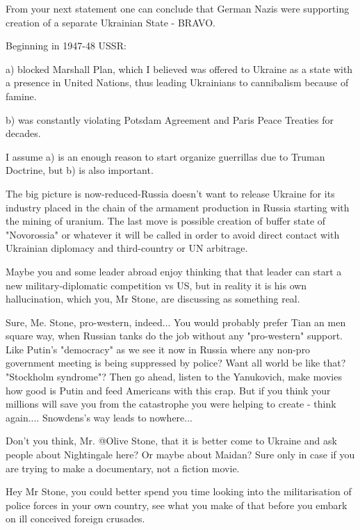 \begin{itemize}
From your next statement one can conclude that German Nazis were supporting
creation of a separate Ukrainian State - BRAVO.

Beginning in 1947-48 USSR:

a) blocked Marshall Plan, which I believed was offered to Ukraine as a state
with a presence in United Nations, thus leading Ukrainians to cannibalism
because of famine.

b) was constantly violating Potsdam Agreement and Paris Peace Treaties for decades.

I assume a) is an enough reason to start organize guerrillas due to Truman
Doctrine, but b) is also important.

The big picture is now-reduced-Russia doesn't want to release Ukraine for its
industry placed in the chain of the armament production in Russia starting with
the mining of uranium. The last move is possible creation of buffer state of
"Novorossia" or whatever it will be called in order to avoid direct contact
with Ukrainian diplomacy and third-country or UN arbitrage.

Maybe you and some leader abroad enjoy thinking that that leader can start a
new military-diplomatic competition vs US, but in reality it is his own
hallucination, which you, Mr Stone, are discussing as something real.


Sure, Me. Stone, pro-western, indeed... You would probably prefer Tian an men
square way, when Russian tanks do the job without any "pro-western" support.
Like Putin's "democracy" as we see it now in Russia where any non-pro
government meeting is being suppressed by police? Want all world be like that?
"Stockholm syndrome"? Then go ahead, listen to the Yanukovich, make movies how
good is Putin and feed Americans with this crap. But if you think your millions
will save you from the catastrophe you were helping to create - think again....
Snowdens's way leads to nowhere...


Don't you think, Mr. @Olive Stone, that it is better come to Ukraine and ask
people about Nightingale here? Or maybe about Maidan? Sure only in case if you
are trying to make a documentary, not a fiction movie.


Hey Mr Stone, you could better spend you time looking into the militarisation
of police forces in your own country, see what you make of that before you
embark on ill conceived foreign crusades.


\end{itemize}
